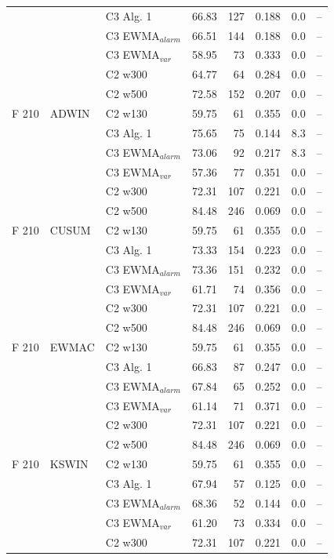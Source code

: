 \begin{longtable}{lllrrrrr}
 &  & C3 Alg. 1 & 66.83 & 127 & 0.188 & 0.0 & -- \\
 &  & C3 EWMA$_{alarm}$ & 66.51 & 144 & 0.188 & 0.0 & -- \\
 &  & C3 EWMA$_{var}$ & 58.95 & 73 & 0.333 & 0.0 & -- \\
 &  & C2 w300 & 64.77 & 64 & 0.284 & 0.0 & -- \\
 &  & C2 w500 & 72.58 & 152 & 0.207 & 0.0 & -- \\
\hline
F  210 & ADWIN & C2 w130 & 59.75 & 61 & 0.355 & 0.0 & -- \\
 &  & C3 Alg. 1 & 75.65 & 75 & 0.144 & 8.3 & -- \\
 &  & C3 EWMA$_{alarm}$ & 73.06 & 92 & 0.217 & 8.3 & -- \\
 &  & C3 EWMA$_{var}$ & 57.36 & 77 & 0.351 & 0.0 & -- \\
 &  & C2 w300 & 72.31 & 107 & 0.221 & 0.0 & -- \\
 &  & C2 w500 & 84.48 & 246 & 0.069 & 0.0 & -- \\
\hline
F  210 & CUSUM & C2 w130 & 59.75 & 61 & 0.355 & 0.0 & -- \\
 &  & C3 Alg. 1 & 73.33 & 154 & 0.223 & 0.0 & -- \\
 &  & C3 EWMA$_{alarm}$ & 73.36 & 151 & 0.232 & 0.0 & -- \\
 &  & C3 EWMA$_{var}$ & 61.71 & 74 & 0.356 & 0.0 & -- \\
 &  & C2 w300 & 72.31 & 107 & 0.221 & 0.0 & -- \\
 &  & C2 w500 & 84.48 & 246 & 0.069 & 0.0 & -- \\
\hline
F  210 & EWMAC & C2 w130 & 59.75 & 61 & 0.355 & 0.0 & -- \\
 &  & C3 Alg. 1 & 66.83 & 87 & 0.247 & 0.0 & -- \\
 &  & C3 EWMA$_{alarm}$ & 67.84 & 65 & 0.252 & 0.0 & -- \\
 &  & C3 EWMA$_{var}$ & 61.14 & 71 & 0.371 & 0.0 & -- \\
 &  & C2 w300 & 72.31 & 107 & 0.221 & 0.0 & -- \\
 &  & C2 w500 & 84.48 & 246 & 0.069 & 0.0 & -- \\
\hline
F  210 & KSWIN & C2 w130 & 59.75 & 61 & 0.355 & 0.0 & -- \\
 &  & C3 Alg. 1 & 67.94 & 57 & 0.125 & 0.0 & -- \\
 &  & C3 EWMA$_{alarm}$ & 68.36 & 52 & 0.144 & 0.0 & -- \\
 &  & C3 EWMA$_{var}$ & 61.20 & 73 & 0.334 & 0.0 & -- \\
 &  & C2 w300 & 72.31 & 107 & 0.221 & 0.0 & -- \\

\end{longtable}
